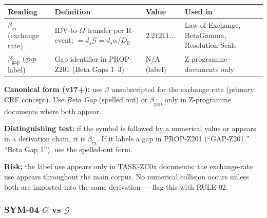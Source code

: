 \documentclass[12pt, a4paper]{article}
\begin{document}
\begin{redbox}[title={SYM-03 \textmd{---} $\beta$ \textmd{(two distinct concepts)}}]

\medskip
\renewcommand{\arraystretch}{1.35}
\begin{tabular}{p{2.8cm} p{4.2cm} p{1.8cm} p{3.5cm}}
\toprule
\textbf{Reading} & \textbf{Definition} &
\textbf{Value} & \textbf{Used in}\\
\midrule
$\beta_{\text{ex}}$ (exchange rate) &
  IDV-to-$\Omega$ transfer per R-event;
  $= d_s\mathcal{G} = d_s\alpha/D_0$ &
  $2.21211\ldots$ &
  Law of Exchange, BetaGamma, Resolution Scale\\
$\beta_{\text{gap}}$ (gap label) &
  Gap identifier in PROP-Z201 (Beta Gaps 1--3) &
  N/A (label) &
  Z-programme documents only\\
\bottomrule
\end{tabular}

\medskip
\textbf{Canonical form (v17+):} use $\beta$ unsubscripted for the
exchange rate (primary CRF concept). Use \emph{Beta Gap} (spelled
out) or $\beta_{\text{gap}}$ only in Z-programme documents where
both appear.

\textbf{Distinguishing test:} if the symbol is followed by a
numerical value or appears in a derivation chain, it is
$\beta_{\text{ex}}$. If it labels a gap in PROP-Z201 (``GAP-Z201,''
``Beta Gap 1''), use the spelled-out form.

\textbf{Risk:} the label use appears only in TASK-ZC0x documents;
the exchange-rate use appears throughout the main corpus. No
numerical collision occurs unless both are imported into the same
derivation — flag this with RULE-02.
\end{redbox}

\subsubsection*{SYM-04 \quad $G$ vs $\mathcal{G}$}
\end{document}

